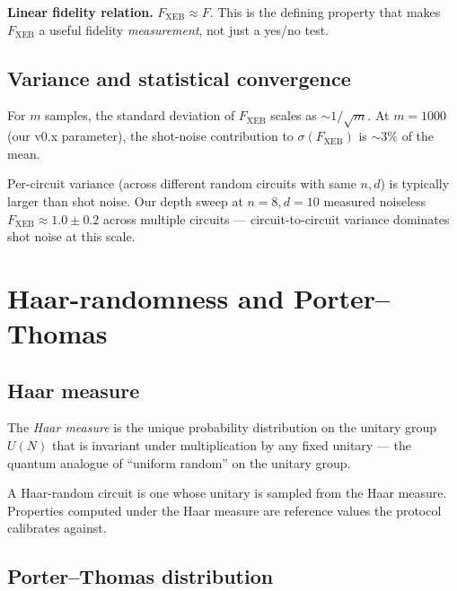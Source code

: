 \documentclass[11pt,a4paper]{article}
\theoremstyle{plain}
\theoremstyle{definition}
\theoremstyle{remark}
\begin{document}
\begin{factbox}
\textbf{Linear fidelity relation.} $F_{\mathrm{XEB}} \approx F$. This is the defining property that makes $F_{\mathrm{XEB}}$ a useful fidelity \emph{measurement}, not just a yes/no test.
\end{factbox}

\subsection{Variance and statistical convergence}

For $m$ samples, the standard deviation of $F_{\mathrm{XEB}}$ scales as $\sim 1/\sqrt{m}$. At $m=1000$ (our v0.x parameter), the shot-noise contribution to $\sigma(F_{\mathrm{XEB}})$ is $\sim 3\%$ of the mean.

Per-circuit variance (across different random circuits with same $n, d$) is typically larger than shot noise. Our depth sweep at $n=8, d=10$ measured noiseless $F_{\mathrm{XEB}} \approx 1.0 \pm 0.2$ across multiple circuits --- circuit-to-circuit variance dominates shot noise at this scale.

\section{Haar-randomness and Porter--Thomas}
\label{sec:haar-pt}

\subsection{Haar measure}

The \emph{Haar measure} is the unique probability distribution on the unitary group $U(N)$ that is invariant under multiplication by any fixed unitary --- the quantum analogue of ``uniform random'' on the unitary group.

A Haar-random circuit is one whose unitary is sampled from the Haar measure. Properties computed under the Haar measure are reference values the protocol calibrates against.

\subsection{Porter--Thomas distribution}
\end{document}

